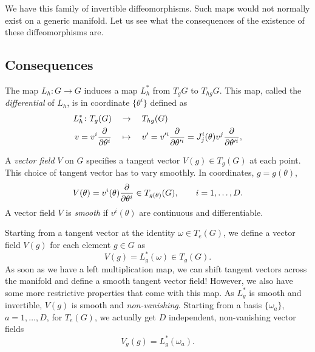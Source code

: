 We have this family of invertible diffeomorphisms. Such maps would not normally exist on a generic manifold. Let us see what the consequences of the existence of these diffeomorphisms are.

\subsection{Consequences}%
\label{sub:consequences}

\begin{wrapfigure}{R}{0.35\columnwidth}
  \centering
  \def\svgwidth{0.3\columnwidth}
  
  \label{fig:l8f2}
\end{wrapfigure}

The map $L_h \colon G \to G$ induces a map $L^*_h$ from $T_g G$ to $T_{hg} G$.
This map, called the \emph{differential} of $L_h$, is in coordinate $\{\theta^i\}$ defined as
\begin{equation}
  \begin{split}
    L_h^* \colon T_g(G) \quad &\to \quad T_{hg}(G) \\
    v = v^i \pdv{}{\theta^i} \quad &\mapsto \quad v' = v'^i \pdv{}{\theta'^i} = J^i_j(\theta) v^j \pdv{}{\theta'^i},
  \end{split}
\end{equation}

\begin{definition}[]
  A \emph{vector field} $V$ on $G$ specifies a tangent vector $V(g) \in T_g(G)$ at each point. This choice of tangent vector has to vary smoothly.
  In coordinates, $g = g(\theta)$,
  \begin{equation}
    V(\theta) = v^i(\theta) \pdv{}{\theta^i} \in T_{g(\theta)}(G), \qquad i = 1, \dots, D.
  \end{equation}
  A vector field $V$ is \emph{smooth} if $v^i(\theta)$ are continuous and differentiable.
\end{definition}

Starting from a tangent vector at the identity $\omega \in T_e(G)$, we define a vector field $V(g)$ for each element $g \in G$ as
\begin{equation}
  V(g) = L^*_g(\omega) \in T_g(G).
\end{equation}
As soon as we have a left multiplication map, we can shift tangent vectors across the manifold and define a smooth tangent vector field! However, we also have some more restrictive properties that come with this map. As $L^*_g$ is smooth and invertible, $V(g)$ is smooth and \emph{non-vanishing}.
Starting from a basis $\{\omega_a\}$, $a = 1, \dots, D$, for $T_e(G)$, we actually get $D$ independent, non-vanishing vector fields
\begin{equation}
  V_g(g) = L^*_g(\omega_a).
\end{equation}

